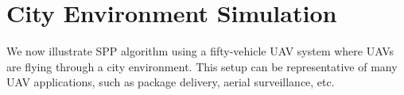 \section{City Environment Simulation \label{sec:city_sim}}
We now illustrate SPP algorithm using a fifty-vehicle UAV system where UAVs are flying through a city environment. This setup can be representative of many UAV applications, such as package delivery, aerial surveillance, etc. 